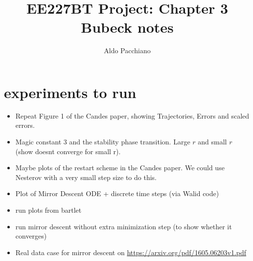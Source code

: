 \documentclass{article}
\title{EE227BT Project:
Chapter 3 Bubeck notes}
\author{Aldo Pacchiano}
\begin{document}
\maketitle


\section{experiments to run}



\begin{itemize}
    \item Repeat Figure 1 of the Candes paper, showing Trajectories, Errors and scaled errors. 
    \item Magic constant 3 and the stability phase transition. Large $r$ and small $r$ (show doesnt converge for small r). 
    \item Maybe plots of the restart scheme in the Candes paper. We could use Nesterov with a very small step size to do this.
    \item Plot of Mirror Descent ODE + discrete time steps (via Walid code)
    \item run plots from bartlet
    \item run mirror descent without extra minimization step (to show whether it converges)
    \item Real data case for mirror descent on 
    \url{https://arxiv.org/pdf/1605.06203v1.pdf}
\end{itemize}





\end{document}
